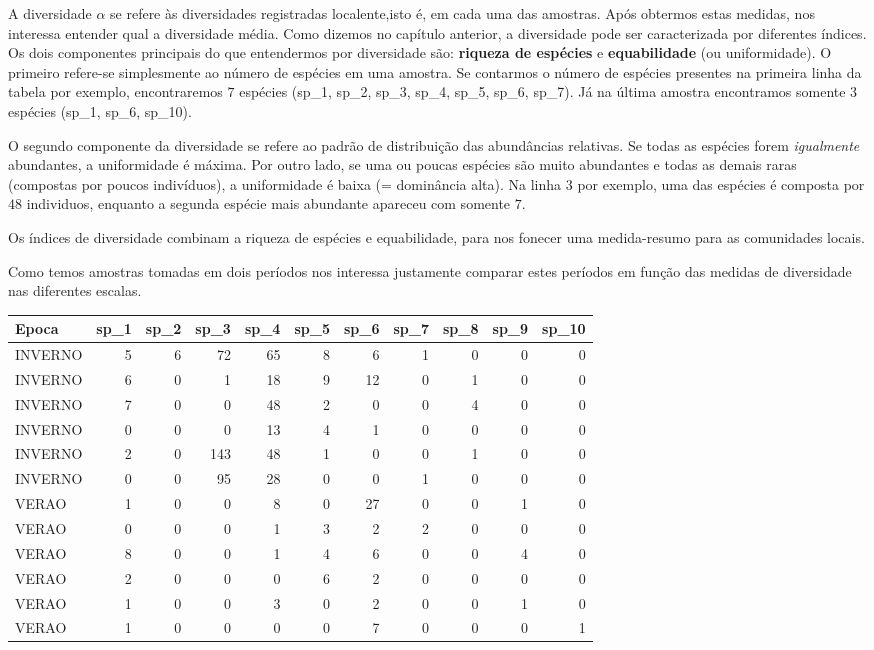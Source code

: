 \documentclass[
]{book}
\begin{document}
A diversidade \(\alpha\) se refere às diversidades registradas localente,isto é, em cada uma das amostras. Após obtermos estas medidas, nos interessa entender qual a diversidade média. Como dizemos no capítulo anterior, a diversidade pode ser caracterizada por diferentes índices. Os dois componentes principais do que entendermos por diversidade são: \textbf{riqueza de espécies} e \textbf{equabilidade} (ou uniformidade). O primeiro refere-se simplesmente ao número de espécies em uma amostra. Se contarmos o número de espécies presentes na primeira linha da tabela por exemplo, encontraremos \(7\) espécies (sp\_1, sp\_2, sp\_3, sp\_4, sp\_5, sp\_6, sp\_7). Já na última amostra encontramos somente \(3\) espécies (sp\_1, sp\_6, sp\_10).

O segundo componente da diversidade se refere ao padrão de distribuição das abundâncias relativas. Se todas as espécies forem \emph{igualmente} abundantes, a uniformidade é máxima. Por outro lado, se uma ou poucas espécies são muito abundantes e todas as demais raras (compostas por poucos indivíduos), a uniformidade é baixa (= dominância alta). Na linha \(3\) por exemplo, uma das espécies é composta por \(48\) individuos, enquanto a segunda espécie mais abundante apareceu com somente \(7\).

Os índices de diversidade combinam a riqueza de espécies e equabilidade, para nos fonecer uma medida-resumo para as comunidades locais.

Como temos amostras tomadas em dois períodos nos interessa justamente comparar estes períodos em função das medidas de diversidade nas diferentes escalas.

\begin{tabular}{l|r|r|r|r|r|r|r|r|r|r}
\hline
Epoca & sp\_1 & sp\_2 & sp\_3 & sp\_4 & sp\_5 & sp\_6 & sp\_7 & sp\_8 & sp\_9 & sp\_10\\
\hline
INVERNO & 5 & 6 & 72 & 65 & 8 & 6 & 1 & 0 & 0 & 0\\
\hline
INVERNO & 6 & 0 & 1 & 18 & 9 & 12 & 0 & 1 & 0 & 0\\
\hline
INVERNO & 7 & 0 & 0 & 48 & 2 & 0 & 0 & 4 & 0 & 0\\
\hline
INVERNO & 0 & 0 & 0 & 13 & 4 & 1 & 0 & 0 & 0 & 0\\
\hline
INVERNO & 2 & 0 & 143 & 48 & 1 & 0 & 0 & 1 & 0 & 0\\
\hline
INVERNO & 0 & 0 & 95 & 28 & 0 & 0 & 1 & 0 & 0 & 0\\
\hline
VERAO & 1 & 0 & 0 & 8 & 0 & 27 & 0 & 0 & 1 & 0\\
\hline
VERAO & 0 & 0 & 0 & 1 & 3 & 2 & 2 & 0 & 0 & 0\\
\hline
VERAO & 8 & 0 & 0 & 1 & 4 & 6 & 0 & 0 & 4 & 0\\
\hline
VERAO & 2 & 0 & 0 & 0 & 6 & 2 & 0 & 0 & 0 & 0\\
\hline
VERAO & 1 & 0 & 0 & 3 & 0 & 2 & 0 & 0 & 1 & 0\\
\hline
VERAO & 1 & 0 & 0 & 0 & 0 & 7 & 0 & 0 & 0 & 1\\
\hline
\end{tabular}

  
\end{document}
